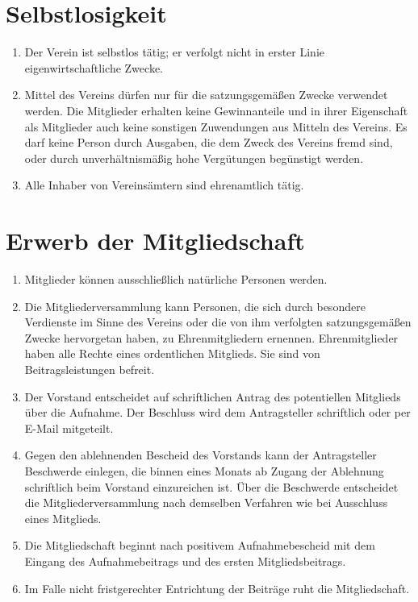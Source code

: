 \documentclass[a4paper, 12pt]{scrartcl}
\begin{document}
\section{Selbstlosigkeit}
\begin{enumerate}
	\item Der Verein ist selbstlos tätig; er verfolgt nicht in erster Linie eigenwirtschaftliche Zwecke.
	\item Mittel des Vereins dürfen nur für die satzungsgemäßen Zwecke verwendet werden. Die Mitglieder erhalten keine Gewinnanteile und in ihrer Eigenschaft als Mitglieder auch keine sonstigen Zuwendungen aus Mitteln des Vereins. Es darf keine Person durch Ausgaben, die dem Zweck des Vereins fremd sind, oder durch unverhältnismäßig hohe Vergütungen begünstigt werden.
	\item Alle Inhaber von Vereinsämtern sind ehrenamtlich tätig.
\end{enumerate}

\section{Erwerb der Mitgliedschaft}
\label{erwerb-der-mitgliedschaft}
\begin{enumerate}
	\item Mitglieder können ausschließlich natürliche Personen werden.
	\item Die Mitgliederversammlung kann Personen, die sich durch besondere Verdienste im Sinne des Vereins oder die von ihm verfolgten satzungsgemäßen Zwecke hervorgetan haben, zu Ehrenmitgliedern ernennen. Ehrenmitglieder haben alle Rechte eines ordentlichen Mitglieds. Sie sind von Beitragsleistungen befreit.
	\item Der Vorstand entscheidet auf schriftlichen Antrag des potentiellen  Mitglieds über die Aufnahme. Der Beschluss wird dem Antragsteller schriftlich oder per E-Mail mitgeteilt.
	\item Gegen den ablehnenden Bescheid des Vorstands kann der Antragsteller Beschwerde einlegen, die binnen eines Monats ab Zugang der Ablehnung schriftlich beim Vorstand einzureichen ist. Über die Beschwerde entscheidet die Mitgliederversammlung nach demselben Verfahren wie bei Ausschluss eines Mitglieds.
	\item \label{beginn-mitgliedschaft} Die Mitgliedschaft beginnt nach positivem Aufnahmebescheid mit dem Eingang des Aufnahmebeitrags und des ersten Mitgliedsbeitrags.
	\item Im Falle nicht fristgerechter Entrichtung der Beiträge ruht die Mitgliedschaft.
\end{enumerate}
\end{document}
